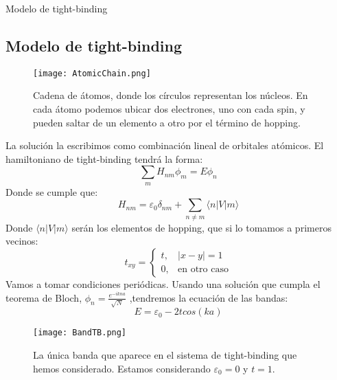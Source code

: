 \documentclass{beamer}
\begin{document}
\begin{frame}{Modelo de tight-binding \cite{AshcroftSSP} \cite{simon2013oxford}}
    \subsection{Modelo de tight-binding}
    \begin{figure}[h!]
        \begin{center}
            \texttt{[image: AtomicChain.png]}
            \caption{Cadena de átomos, donde los círculos representan los núcleos. En cada átomo podemos ubicar dos electrones, uno con cada spin, y pueden saltar de un elemento a otro por el término de hopping.}
            \label{fig:TBChain}
        \end{center}
    \end{figure}
\end{frame}
\begin{frame}
    La solución la escribimos como combinación lineal de orbitales atómicos. El hamiltoniano de tight-binding tendrá la forma:
    \begin{equation}
        \sum_m H_{nm}\phi_m = E\phi_n
    \end{equation}
    Donde se cumple que:
    \begin{equation}
        H_{nm} = \varepsilon_0\delta_{nm} + \sum_{n\neq m}\langle n | V | m \rangle
    \label{eq:hamElements}
    \end{equation}
    Donde $\langle n | V | m \rangle$ serán los elementos de hopping, que si lo tomamos a primeros vecinos:
    \begin{equation}
        t_{xy} = \left\{\begin{array}{cc}
            t, & |x - y| = 1 \\
            0, & \text{en otro caso}
        \end{array}\right.
        \label{eq:hoppinFN}
    \end{equation}
    Vamos a tomar condiciones periódicas. Usando una solución que cumpla el teorema de Bloch, $\phi_n = \frac{e^{-ikna}}{\sqrt{N}}$ ,tendremos la ecuación de las bandas:
    \begin{equation}
        E = \varepsilon_0 - 2tcos(ka)
        \label{eq:bandasTB}
    \end{equation}
\end{frame}
\begin{frame}
    \begin{figure}[h!]
        \begin{center}
            \texttt{[image: BandTB.png]}
            \caption{La única banda que aparece en el sistema de tight-binding que hemos considerado. Estamos considerando $\varepsilon_0 = 0$ y $t = 1$.}
            \label{fig:bandaTB}
        \end{center}
    \end{figure}
\end{frame}
\end{document}

